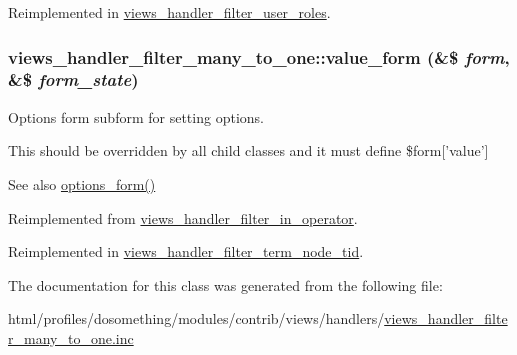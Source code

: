 Reimplemented in \hyperlink{classviews__handler__filter__user__roles_a9ec9e9b4e15492709ed2be2951dc6d19}{views\_\-handler\_\-filter\_\-user\_\-roles}.\hypertarget{classviews__handler__filter__many__to__one_a6c5e3bbabc2ed73418f835195c10f451}{
\subsubsection[{value\_\-form}]{\setlength{\rightskip}{0pt plus 5cm}views\_\-handler\_\-filter\_\-many\_\-to\_\-one::value\_\-form (\&\$ {\em form}, \/  \&\$ {\em form\_\-state})}}
\label{classviews__handler__filter__many__to__one_a6c5e3bbabc2ed73418f835195c10f451}
Options form subform for setting options.

This should be overridden by all child classes and it must define \$form\mbox{[}'value'\mbox{]}

\begin{DoxySeeAlso}{See also}
\hyperlink{classviews__handler__filter_af14c69367162057a32709a6340de0988}{options\_\-form()} 
\end{DoxySeeAlso}


Reimplemented from \hyperlink{classviews__handler__filter__in__operator_a6736083657cad0f8c7299b000f2b8e60}{views\_\-handler\_\-filter\_\-in\_\-operator}.

Reimplemented in \hyperlink{classviews__handler__filter__term__node__tid_a3259d8a91cb0c13c51c02942b267b131}{views\_\-handler\_\-filter\_\-term\_\-node\_\-tid}.

The documentation for this class was generated from the following file:\begin{DoxyCompactItemize}
\item 
html/profiles/dosomething/modules/contrib/views/handlers/\hyperlink{views__handler__filter__many__to__one_8inc}{views\_\-handler\_\-filter\_\-many\_\-to\_\-one.inc}\end{DoxyCompactItemize}
